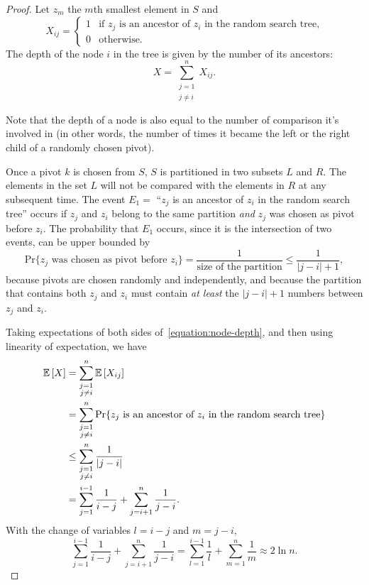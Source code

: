 \begin{proof}
  Let $z_m$ the $m$th smallest element in $S$ and $$X_{ij}=
  \left\{
    \begin{array}{ll}
      1 & \mbox{if $z_j$ is an ancestor of $z_i$ in the random search tree,} \\
      0 & \mbox{otherwise.}
    \end{array}
  \right.$$
  The depth of the node $i$ in the tree is given by the number of its ancestors:
  \begin{equation}
    X=\sum_{\substack{j=1 \\ j\ne i}}^n X_{ij}.
    \label{equation:node-depth}
  \end{equation}

  Note that the depth of a node is also equal to the number of comparison it's
  involved in (in other words, the number of times it became the left or the
  right child of a randomly chosen pivot).

  Once a pivot $k$ is chosen from $S$, $S$ is partitioned in two subsets $L$ and
  $R$. The elements in the set $L$ will not be compared with the elements in $R$
  at any subsequent time. The event $E_1=$ ``$z_j$ is an ancestor of $z_i$ in the
  random search tree'' occurs if $z_j$ and $z_i$ belong to the same partition
  \emph{and} $z_j$ was chosen as pivot before $z_i$. The probability that $E_1$
  occurs, since it is the intersection of two events, can be upper bounded by
  $$\text{Pr}\{ z_j \text{ was chosen as pivot before } z_i
  \}=\frac{1}{\text{size of the partition}}\leq\frac{1}{|j-i|+1},$$ because
  pivots are chosen randomly and independently, and because the partition that
  contains both $z_j$ and $z_i$ must contain \emph{at least} the $|j-i|+1$
  numbers between $z_j$ and $z_i$.

  Taking expectations of both sides of~\eqref{equation:node-depth}, and then
  using linearity of expectation, we have
  \begin{align*}
    \mathbb{E}\left[{X}\right] & = \sum_{\substack{j=1\\ j\ne i}}^n \mathbb{E}\left[{X_{ij}}\right] \\
    & = \sum_{\substack{j=1\\ j\ne i}}^n \text{Pr}\{ z_j \text{ is an ancestor
      of } z_i \text{ in the random search tree} \} \\
    & \le \sum_{\substack{j=1\\ j\ne i}}^n \frac{1}{|j-i|} \\
    & = \sum_{j=1}^{i-1} \frac{1}{i-j} + \sum_{j=i+1}^{n} \frac{1}{j-i}.
  \end{align*}
  With the change of variables $l=i-j$ and $m=j-i$,
  \begin{equation*}
    \sum_{j=1}^{i-1} \frac{1}{i-j} + \sum_{j=i+1}^{n} \frac{1}{j-i} = \sum_{l=1}^{i-1} \frac{1}{l} + \sum_{m=1}^{n} \frac{1}{m} \approx 2\ln n.
  \end{equation*}

\end{proof}

